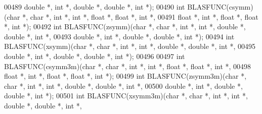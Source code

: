 \begin{DoxyCode}
00489        \textcolor{keywordtype}{double} *, \textcolor{keywordtype}{int} *, \textcolor{keywordtype}{double} *, \textcolor{keywordtype}{double} *, \textcolor{keywordtype}{int} *);
00490 \textcolor{keywordtype}{int} BLASFUNC(csymm)(\textcolor{keywordtype}{char} *, \textcolor{keywordtype}{char} *, \textcolor{keywordtype}{int} *, \textcolor{keywordtype}{int} *, \textcolor{keywordtype}{float}  *, \textcolor{keywordtype}{float}  *, \textcolor{keywordtype}{int} *,
00491        \textcolor{keywordtype}{float}  *, \textcolor{keywordtype}{int} *, \textcolor{keywordtype}{float}  *, \textcolor{keywordtype}{float}  *, \textcolor{keywordtype}{int} *);
00492 \textcolor{keywordtype}{int} BLASFUNC(zsymm)(\textcolor{keywordtype}{char} *, \textcolor{keywordtype}{char} *, \textcolor{keywordtype}{int} *, \textcolor{keywordtype}{int} *, \textcolor{keywordtype}{double} *, \textcolor{keywordtype}{double} *, \textcolor{keywordtype}{int} *,
00493        \textcolor{keywordtype}{double} *, \textcolor{keywordtype}{int} *, \textcolor{keywordtype}{double} *, \textcolor{keywordtype}{double} *, \textcolor{keywordtype}{int} *);
00494 \textcolor{keywordtype}{int} BLASFUNC(xsymm)(\textcolor{keywordtype}{char} *, \textcolor{keywordtype}{char} *, \textcolor{keywordtype}{int} *, \textcolor{keywordtype}{int} *, \textcolor{keywordtype}{double} *, \textcolor{keywordtype}{double} *, \textcolor{keywordtype}{int} *,
00495        \textcolor{keywordtype}{double} *, \textcolor{keywordtype}{int} *, \textcolor{keywordtype}{double} *, \textcolor{keywordtype}{double} *, \textcolor{keywordtype}{int} *);
00496 
00497 \textcolor{keywordtype}{int} BLASFUNC(csymm3m)(\textcolor{keywordtype}{char} *, \textcolor{keywordtype}{char} *, \textcolor{keywordtype}{int} *, \textcolor{keywordtype}{int} *, \textcolor{keywordtype}{float}  *, \textcolor{keywordtype}{float}  *, \textcolor{keywordtype}{int} *,
00498        \textcolor{keywordtype}{float}  *, \textcolor{keywordtype}{int} *, \textcolor{keywordtype}{float}  *, \textcolor{keywordtype}{float}  *, \textcolor{keywordtype}{int} *);
00499 \textcolor{keywordtype}{int} BLASFUNC(zsymm3m)(\textcolor{keywordtype}{char} *, \textcolor{keywordtype}{char} *, \textcolor{keywordtype}{int} *, \textcolor{keywordtype}{int} *, \textcolor{keywordtype}{double} *, \textcolor{keywordtype}{double} *, \textcolor{keywordtype}{int} *,
00500        \textcolor{keywordtype}{double} *, \textcolor{keywordtype}{int} *, \textcolor{keywordtype}{double} *, \textcolor{keywordtype}{double} *, \textcolor{keywordtype}{int} *);
00501 \textcolor{keywordtype}{int} BLASFUNC(xsymm3m)(\textcolor{keywordtype}{char} *, \textcolor{keywordtype}{char} *, \textcolor{keywordtype}{int} *, \textcolor{keywordtype}{int} *, \textcolor{keywordtype}{double} *, \textcolor{keywordtype}{double} *, \textcolor{keywordtype}{int} *,

\end{DoxyCode}
